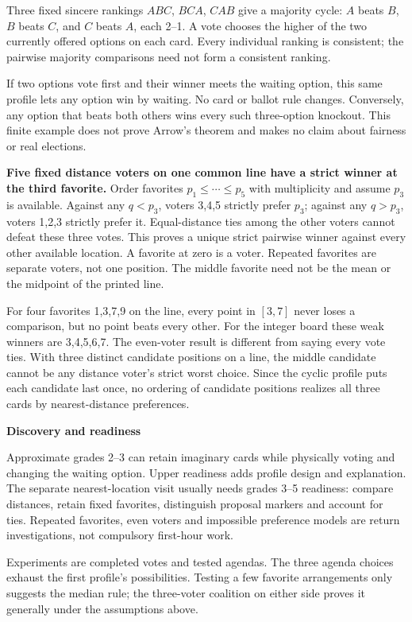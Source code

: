\documentclass[11pt,letterpaper]{article}
\newcommand{\heading}[1]{\par\vspace{4pt}{\large\bfseries #1}\par}
\newcommand{\sub}[1]{\par\textbf{#1}\par}
\begin{document}
\heading{Mathematical overview}
Three fixed sincere rankings $ABC$, $BCA$, $CAB$ give a majority cycle: $A$ beats $B$, $B$ beats $C$, and $C$ beats $A$, each 2--1. A vote chooses the higher of the two currently offered options on each card. Every individual ranking is consistent; the pairwise majority comparisons need not form a consistent ranking.

If two options vote first and their winner meets the waiting option, this same profile lets any option win by waiting. No card or ballot rule changes. Conversely, any option that beats both others wins every such three-option knockout. This finite example does not prove Arrow's theorem and makes no claim about fairness or real elections.

\textbf{Five fixed distance voters on one common line have a strict winner at the third favorite.} Order favorites $p_1\leq\cdots\leq p_5$ with multiplicity and assume $p_3$ is available. Against any $q<p_3$, voters 3,4,5 strictly prefer $p_3$; against any $q>p_3$, voters 1,2,3 strictly prefer it. Equal-distance ties among the other voters cannot defeat these three votes. This proves a unique strict pairwise winner against every other available location. A favorite at zero is a voter. Repeated favorites are separate voters, not one position. The middle favorite need not be the mean or the midpoint of the printed line.

For four favorites 1,3,7,9 on the line, every point in $[3,7]$ never loses a comparison, but no point beats every other. For the integer board these weak winners are 3,4,5,6,7. The even-voter result is different from saying every vote ties. With three distinct candidate positions on a line, the middle candidate cannot be any distance voter's strict worst choice. Since the cyclic profile puts each candidate last once, no ordering of candidate positions realizes all three cards by nearest-distance preferences.

\sub{Discovery and readiness}
Approximate grades 2--3 can retain imaginary cards while physically voting and changing the waiting option. Upper readiness adds profile design and explanation. The separate nearest-location visit usually needs grades 3--5 readiness: compare distances, retain fixed favorites, distinguish proposal markers and account for ties. Repeated favorites, even voters and impossible preference models are return investigations, not compulsory first-hour work.

Experiments are completed votes and tested agendas. The three agenda choices exhaust the first profile's possibilities. Testing a few favorite arrangements only suggests the median rule; the three-voter coalition on either side proves it generally under the assumptions above.
\end{document}
